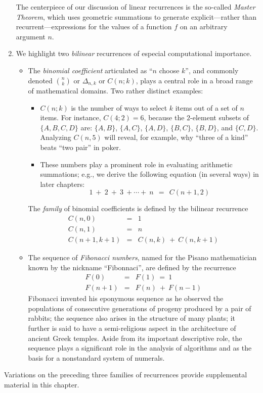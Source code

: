\begin{enumerate}
The centerpiece of our discussion of linear recurrences is the
so-called {\em Master Theorem}, which uses geometric summations to
generate explicit---rather than recurrent---expressions for the values
of a function $f$ on an arbitrary argument $n$.

\item
We highlight two {\it bilinear} recurrences of especial computational
importance.
  \begin{itemize}
  \item
The {\it binomial coefficient} articulated as ``$n$ choose $k$'', and
commonly denoted $\displaystyle {n \choose k}$ or $\Delta_{n,k}$ or
$C(n;k)$, plays a central role in a broad range of mathematical
domains.  Two rather distinct examples:

       \begin{itemize}
       \item
$C(n;k)$ is the number of ways to select $k$ items out of a set of $n$
items.  For instance, $C(4;2) =6$, because the $2$-element subsets of
$\{A, B, C, D\}$ are: $\{A, B\}$, $\{A, C\}$, $\{A, D\}$,  $\{B, C\}$,
$\{B, D\}$,  and $\{C, D\}$.  Analyzing $C(n, 5)$ will reveal, for
example, why ``three of a kind'' beats ``two pair'' in poker.
       \item
These numbers play a prominent role in evaluating arithmetic
summations; e.g., we derive the following equation (in several ways)
in later chapters:
\[ 1 \ + \ 2 \ + \ 3 \ + \cdots + \ n \ \ = \ \ C(n+1, 2) \]
       \end{itemize}
The {\em family} of binomial coefficients is defined by the bilinear
recurrence
\begin{eqnarray*}
C(n, 0) & = & 1 \\
C(n, 1) & = & n \\
C(n+1, k+1) & = & C(n, k) \ + \ C(n, k+1)
\end{eqnarray*}

  \item
The sequence of {\it Fibonacci numbers}, named for the Pisano
mathematician known by the nickname ``Fibonnaci'', are defined by the
recurrence
\begin{eqnarray*}
F(0) & = & F(1) \ = \ 1 \\
F(n+1) & = & F(n) \ + \ F(n-1)
\end{eqnarray*}
Fibonacci invented his eponymous sequence as he observed the
populations of consecutive generations of progeny produced by a pair
of rabbits; the sequence also arises in the structure of many plants;
it further is said to have a semi-religious aspect in the architecture
of ancient Greek temples.
Aside from its important descriptive role, the sequence plays a
significant role in the analysis of algorithms and as the basis for a
nonstandard system of numerals.
  \end{itemize}
\end{enumerate}
Variations on the preceding three families of recurrences provide
supplemental material in this chapter.


